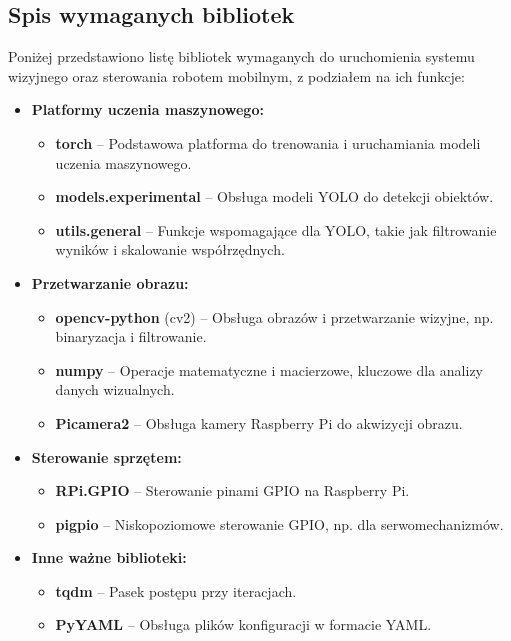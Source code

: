 \documentclass[a4paper,twoside,12pt]{book}
\begin{document}
\subsection{Spis wymaganych bibliotek}
Poniżej przedstawiono listę bibliotek wymaganych do uruchomienia systemu wizyjnego oraz sterowania robotem mobilnym, z podziałem na ich funkcje:

\begin{itemize}
    \item \textbf{Platformy uczenia maszynowego:}
    \begin{itemize}
        \item \textbf{torch} – Podstawowa platforma do trenowania i uruchamiania modeli uczenia maszynowego.
        \item \textbf{models.experimental} – Obsługa modeli YOLO do detekcji obiektów.
        \item \textbf{utils.general} – Funkcje wspomagające dla YOLO, takie jak filtrowanie wyników i skalowanie współrzędnych.
    \end{itemize}
    
    \item \textbf{Przetwarzanie obrazu:}
    \begin{itemize}
        \item \textbf{opencv-python} (cv2) – Obsługa obrazów i przetwarzanie wizyjne, np. binaryzacja i filtrowanie.
        \item \textbf{numpy} – Operacje matematyczne i macierzowe, kluczowe dla analizy danych wizualnych.
        \item \textbf{Picamera2} – Obsługa kamery Raspberry Pi do akwizycji obrazu.
    \end{itemize}
\newpage
    
    \item \textbf{Sterowanie sprzętem:}
    \begin{itemize}
        \item \textbf{RPi.GPIO} – Sterowanie pinami GPIO na Raspberry Pi.
        \item \textbf{pigpio} – Niskopoziomowe sterowanie GPIO, np. dla serwomechanizmów.
    \end{itemize}
    
    \item \textbf{Inne ważne biblioteki:}
    \begin{itemize}
        \item \textbf{tqdm} – Pasek postępu przy iteracjach.
        \item \textbf{PyYAML} – Obsługa plików konfiguracji w formacie YAML.
    \end{itemize}
\end{itemize}
\end{document}
